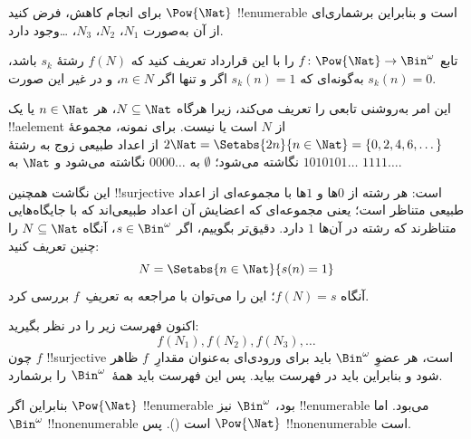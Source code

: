  {
  برای انجام کاهش، فرض کنید $\Pow{\Nat}$ !!{enumerable} است و بنابراین
  برشماری‌ای از آن به‌صورت $N_{1}$، $N_{2}$، $N_{3}$، \dots وجود دارد.

  تابع $f \colon \Pow{\Nat} \to \Bin^\omega$ را با این قرارداد تعریف
  کنید که $f(N)$ رشتهٔ $s_{k}$ باشد، به‌گونه‌ای که $s_{k}(n) = 1$ اگر و تنها
  اگر $n \in N$، و در غیر این صورت $s_k(n) = 0$.

  این امر به‌روشنی تابعی را تعریف می‌کند، زیرا هرگاه $N \subseteq \Nat$،
  هر $n \in \Nat$ یا یک !!a{element} از $N$ است یا نیست. برای نمونه،
  مجموعهٔ $2\Nat = \Setabs{2n}{n \in \Nat} = \{0,2, 4, 6,
  \dots\}$ از اعداد طبیعی زوج به رشتهٔ $1010101\dots$ نگاشته می‌شود؛
  $\emptyset$ به $0000\dots$ نگاشته می‌شود و $\Nat$ به
  $1111\dots$.

  این نگاشت همچنین !!{surjective} است: هر رشته از $0$ها و $1$ها با
  مجموعه‌ای از اعداد طبیعی متناظر است؛ یعنی مجموعه‌ای که اعضایش آن اعداد
  طبیعی‌اند که با جایگاه‌هایی متناظرند که رشته در آن‌ها $1$ دارد. دقیق‌تر
  بگوییم، اگر $s \in \Bin^\omega$، آنگاه $N
  \subseteq \Nat$ را چنین تعریف کنید:
  \[
  N = \Setabs{n \in \Nat}{s(n) = 1}
  \]
  آنگاه $f(N) = s$؛ این را می‌توان با مراجعه به تعریفِ~$f$ بررسی کرد.

  اکنون فهرست زیر را در نظر بگیرید:
  \[
  f(N_1), f(N_2), f(N_3), \dots
  \]
  چون $f$ !!{surjective} است، هر عضوِ $\Bin^\omega$ باید برای ورودی‌ای
  به‌عنوان مقدارِ~$f$ ظاهر شود و بنابراین باید در فهرست بیاید. پس این
  فهرست باید همهٔ~$\Bin^\omega$ را برشمارد.

  بنابراین اگر $\Pow{\Nat}$ !!{enumerable} بود، $\Bin^\omega$ نیز
  !!{enumerable} می‌بود. اما $\Bin^\omega$ !!{nonenumerable} است
  (). پس $\Pow{\Nat}$
  !!{nonenumerable} است.
 }
